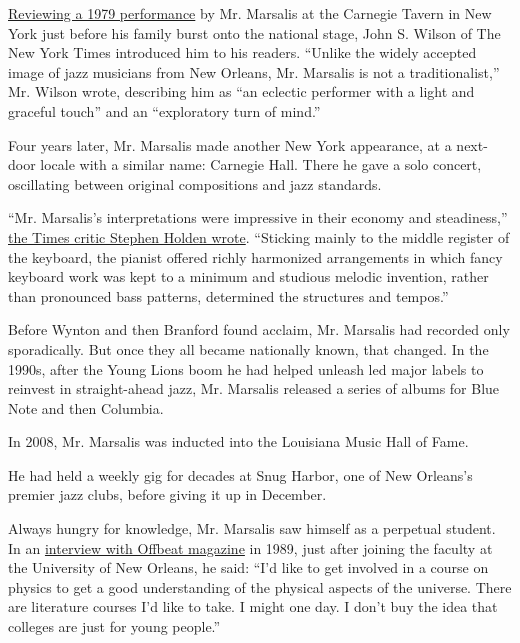 \href{https://www.nytimes3xbfgragh.onion/1979/07/07/archives/jazz-piano-ellis-marsalis-plays-at-carnegie-tavern.html?searchResultPosition=3}{Reviewing
a 1979 performance} by Mr. Marsalis at the Carnegie Tavern in New York
just before his family burst onto the national stage, John S. Wilson of
The New York Times introduced him to his readers. ``Unlike the widely
accepted image of jazz musicians from New Orleans, Mr. Marsalis is not a
traditionalist,'' Mr. Wilson wrote, describing him as ``an eclectic
performer with a light and graceful touch'' and an ``exploratory turn of
mind.''

Four years later, Mr. Marsalis made another New York appearance, at a
next-door locale with a similar name: Carnegie Hall. There he gave a
solo concert, oscillating between original compositions and jazz
standards.

``Mr. Marsalis's interpretations were impressive in their economy and
steadiness,''
\href{https://www.nytimes3xbfgragh.onion/1983/06/29/arts/ellis-marsalis-s-solo-piano.html}{the
Times critic Stephen Holden wrote}. ``Sticking mainly to the middle
register of the keyboard, the pianist offered richly harmonized
arrangements in which fancy keyboard work was kept to a minimum and
studious melodic invention, rather than pronounced bass patterns,
determined the structures and tempos.''

Before Wynton and then Branford found acclaim, Mr. Marsalis had recorded
only sporadically. But once they all became nationally known, that
changed. In the 1990s, after the Young Lions boom he had helped unleash
led major labels to reinvest in straight-ahead jazz, Mr. Marsalis
released a series of albums for Blue Note and then Columbia.

In 2008, Mr. Marsalis was inducted into the Louisiana Music Hall of
Fame.

He had held a weekly gig for decades at Snug Harbor, one of New
Orleans's premier jazz clubs, before giving it up in December.

Always hungry for knowledge, Mr. Marsalis saw himself as a perpetual
student. In an
\href{http://www.offbeat.com/articles/ellis-marsalis-interview/}{interview
with Offbeat magazine} in 1989, just after joining the faculty at the
University of New Orleans, he said: ``I'd like to get involved in a
course on physics to get a good understanding of the physical aspects of
the universe. There are literature courses I'd like to take. I might one
day. I don't buy the idea that colleges are just for young people.''

